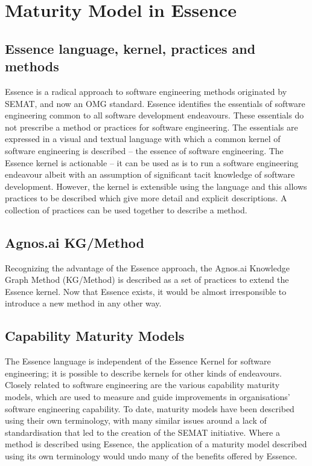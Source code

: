 \pagebreak
\section{Maturity Model in Essence}

\subsection{Essence language, kernel, practices and methods}\label{subsec:Essence-language-kernel-practices-and-methods}

Essence is a radical approach to software engineering methods originated by SEMAT, and now an OMG standard. Essence identifies the essentials of software engineering common to all software development endeavours. These essentials do not prescribe a method or practices for software engineering. The essentials are expressed in a visual and textual language with which a common kernel of software engineering is described – the essence of software engineering. The Essence kernel is actionable – it can be used as is to run a software engineering endeavour albeit with an assumption of significant tacit knowledge of software development. However, the kernel is extensible using the language and this
allows practices to be described which give more detail and explicit descriptions. A collection of practices can be used together to describe a method.

\subsection{Agnos.ai KG/Method}\label{subsec:Agnos-ai-KG-Method}
Recognizing the advantage of the Essence approach, the Agnos.ai Knowledge Graph Method (KG/Method) is described as a set of practices to extend the Essence kernel.
Now that Essence exists, it would be almost irresponsible to introduce a new method in any other way.

\subsection{Capability Maturity Models}\label{subsec:Capability-Maturity-Models}
The Essence language is independent of the Essence Kernel for software engineering; it is possible to describe kernels for other kinds of endeavours. Closely related to software engineering are the various capability maturity models, which are used to measure and guide improvements in organisations’ software engineering capability.
To date, maturity models have been described using their own terminology, with many similar issues around a lack of standardisation that led to the creation of the SEMAT initiative.
Where a method is described using Essence, the application of a maturity model described using its own terminology would undo many of the benefits offered by Essence.

